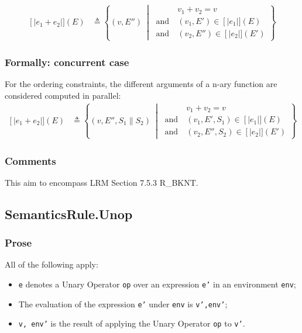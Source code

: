 \documentclass{book}
\newcommand\llbracket{[|}
\newcommand\rrbracket{|]}
\newcommand\interp[1]{\left\llbracket #1 \right\rrbracket}
\newcommand\st[0]{\ \middle|\ }
\begin{document}
  \begin{align}
  \interp{e_1 + e_2} (E) & \triangleq
    \left\{ (v, E'') \st{}
    \begin{aligned}
      & v_1 + v_2 = v
      \\ \text{and}\ &
      (v_1, E') \in{} \interp{e_1} (E)
      \\ \text{and}\ &
      (v_2, E'') \in{} \interp{e_2} (E')
    \end{aligned}
    \right\}
  \label{eq:sem-det-plus}
  \end{align} 

  \subsubsection{Formally: concurrent case}
  For the ordering constraints, the different arguments of a n-ary function
are considered computed in parallel:
  \begin{align}
    \interp{e_1 + e_2} (E) & \triangleq
    \left\{ (v, E'', S_1 \parallel S_2) \st{}
    \begin{aligned}
      & v_1 + v_2 = v
      \\ \text{and}\ &
      (v_1, E', S_1) \in{} \interp{e_1} (E)
      \\ \text{and}\ &
      (v_2, E'', S_2) \in{} \interp{e_2} (E')
    \end{aligned}
    \right\}
  \label{eq:sem-ndet-plus}
  \end{align} 

  \subsubsection{Comments}
  This aim to encompass LRM Section 7.5.3 R\_BKNT.

\subsection{SemanticsRule.Unop \label{sec:SemanticsRule.Unop}}

  \subsubsection{Prose}
  All of the following apply:
  \begin{itemize}
  \item \texttt{e} denotes a Unary Operator \texttt{op} over an expression \texttt{e'} in an environment \texttt{env};
  \item The evaluation of the expression \texttt{e'} under \texttt{env} is \texttt{v',env'};
  \item \texttt{v, env'} is the result of applying the Unary Operator \texttt{op} to \texttt{v'}.
  \end{itemize}
\end{document}
